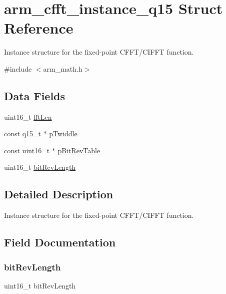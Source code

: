 \hypertarget{structarm__cfft__instance__q15}{}\section{arm\+\_\+cfft\+\_\+instance\+\_\+q15 Struct Reference}
\label{structarm__cfft__instance__q15}


Instance structure for the fixed-\/point C\+F\+F\+T/\+C\+I\+F\+FT function.  




{\ttfamily \#include $<$arm\+\_\+math.\+h$>$}

\subsection*{Data Fields}
\begin{DoxyCompactItemize}
\item 
uint16\+\_\+t \mbox{\hyperlink{structarm__cfft__instance__q15_ab8db3bbe7c61e6bb8ca2a55e3446e11a}{fft\+Len}}
\item 
const \mbox{\hyperlink{arm__math_8h_ab5a8fb21a5b3b983d5f54f31614052ea}{q15\+\_\+t}} $\ast$ \mbox{\hyperlink{structarm__cfft__instance__q15_a7f19217cfa0370f9e518caa882265386}{p\+Twiddle}}
\item 
const uint16\+\_\+t $\ast$ \mbox{\hyperlink{structarm__cfft__instance__q15_a3b229432d381b0a511a9cdbe3aa74e78}{p\+Bit\+Rev\+Table}}
\item 
uint16\+\_\+t \mbox{\hyperlink{structarm__cfft__instance__q15_a65e1b3e327b8fab9404287ed8f347cc8}{bit\+Rev\+Length}}
\end{DoxyCompactItemize}


\subsection{Detailed Description}
Instance structure for the fixed-\/point C\+F\+F\+T/\+C\+I\+F\+FT function. 

\subsection{Field Documentation}
\mbox{\label{structarm__cfft__instance__q15_a65e1b3e327b8fab9404287ed8f347cc8}} 
\subsubsection{\texorpdfstring{bitRevLength}{bitRevLength}}
{\footnotesize\ttfamily uint16\+\_\+t bit\+Rev\+Length}

